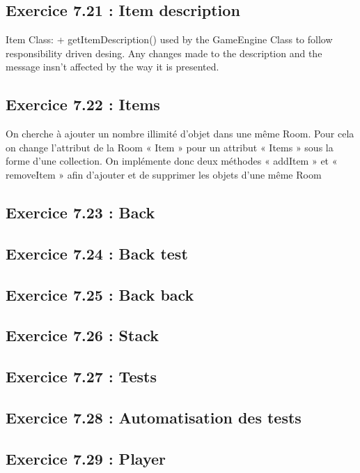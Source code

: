 \documentclass[twoside,french]{report}
\begin{document}
\subsection*{Exercice 7.21 : Item description}
Item Class:
+ getItemDescription() used by the GameEngine Class to follow responsibility driven desing.
Any changes made to the description and the message insn't affected by the way it is presented.




\subsection*{Exercice 7.22 : Items}

On cherche à ajouter un nombre illimité d’objet dans une même Room. Pour 
cela on change l’attribut de la Room « Item »  pour un attribut « Items » sous la 
forme d’une collection. On implémente donc deux méthodes « addItem » et 
« removeItem » afin d’ajouter et de supprimer les objets d’une même Room

\subsection*{Exercice 7.23 : Back}

\subsection*{Exercice 7.24 : Back test}

\subsection*{Exercice 7.25 : Back back}

\subsection*{Exercice 7.26 : Stack}

\subsection*{Exercice 7.27 : Tests}

\subsection*{Exercice 7.28 : Automatisation des tests}

\subsection*{Exercice 7.29 : Player}
\end{document}
